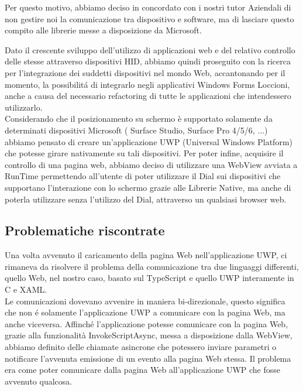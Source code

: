 Per questo motivo, abbiamo deciso in concordato con i nostri tutor Aziendali di non gestire noi la comunicazione tra dispositivo e software, ma di lasciare questo compito alle librerie messe a disposizione da Microsoft.

Dato il crescente sviluppo dell'utilizzo di applicazioni web e del relativo controllo delle stesse attraverso dispositivi HID, abbiamo quindi proseguito con la ricerca per l'integrazione dei suddetti dispositivi nel mondo Web, accantonando per il momento, la possibilitá di integrarlo negli applicativi Windows Forms Loccioni, anche a causa del necessario refactoring di tutte le applicazioni che intendessero utilizzarlo.\\

Considerando che il posizionamento su schermo è supportato solamente da determinati dispositivi Microsoft ( Surface Studio, Surface Pro 4/5/6, ...) abbiamo pensato di creare un’applicazione UWP (Universal Windows Platform) che potesse girare nativamente su tali dispositivi. Per poter infine, acquisire il controllo di una pagina web, abbiamo deciso di utilizzare una WebView avviata a RunTime permettendo all'utente di poter utilizzare il Dial sui dispositivi che supportano l'interazione con lo schermo grazie alle Librerie Native, ma anche di poterla utilizzare senza l'utilizzo del Dial, attraverso un qualsiasi browser web.

\newpage
\subsection{Problematiche riscontrate}

Una volta avvenuto il caricamento della pagina Web nell'applicazione UWP, ci rimaneva da risolvere il problema della comunicazione tra due linguaggi differenti, quello Web, nel nostro caso, basato sul TypeScript e quello UWP interamente in C e XAML.\\

Le comunicazioni dovevano avvenire in maniera bi-direzionale, questo significa che non é solamente l'applicazione UWP a comunicare con la pagina Web, ma anche viceversa. Affinché l'applicazione potesse comunicare con la pagina Web, grazie alla funzionalità InvokeScriptAsync, messa a disposizione dalla WebView, abbiamo definito delle chiamate asincrone che potessero inviare parametri o notificare l'avvenuta emissione di un evento alla pagina Web stessa. Il problema era come poter comunicare dalla pagina Web all'applicazione UWP che fosse avvenuto qualcosa.\\

